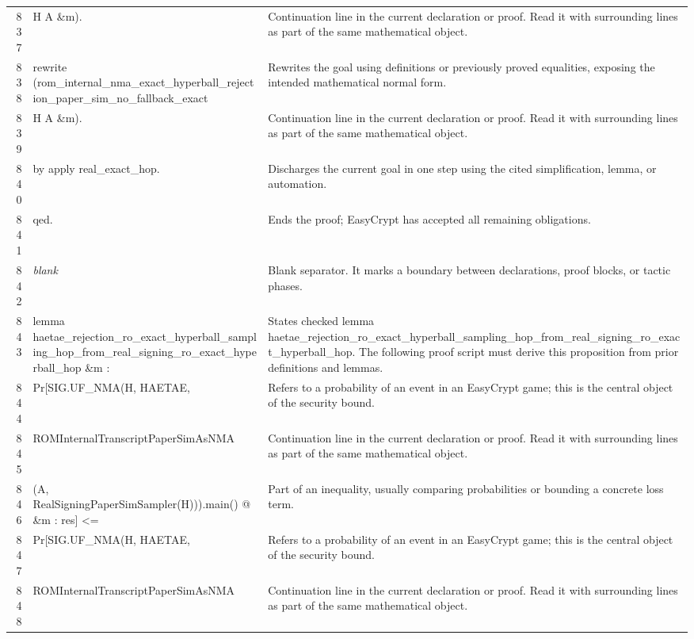 \documentclass[10pt]{article}
\begin{document}
\begin{longtable}{r L{0.53\textwidth} L{0.37\textwidth}}
837 & {\ttfamily\scriptsize             H A \&m).} & Continuation line in the current declaration or proof.  Read it with surrounding lines as part of the same mathematical object. \\
838 & {\ttfamily\scriptsize rewrite (rom\_internal\_nma\_exact\_hyperball\_rejection\_paper\_sim\_no\_fallback\_exact} & Rewrites the goal using definitions or previously proved equalities, exposing the intended mathematical normal form. \\
839 & {\ttfamily\scriptsize            H A \&m).} & Continuation line in the current declaration or proof.  Read it with surrounding lines as part of the same mathematical object. \\
840 & {\ttfamily\scriptsize by apply real\_exact\_hop.} & Discharges the current goal in one step using the cited simplification, lemma, or automation. \\
841 & {\ttfamily\scriptsize qed.} & Ends the proof; EasyCrypt has accepted all remaining obligations. \\
842 & {\ttfamily\scriptsize \emph{blank}} & Blank separator.  It marks a boundary between declarations, proof blocks, or tactic phases. \\
843 & {\ttfamily\scriptsize lemma haetae\_rejection\_ro\_exact\_hyperball\_sampling\_hop\_from\_real\_signing\_ro\_exact\_hyperball\_hop \&m :} & States checked lemma haetae\_rejection\_ro\_exact\_hyperball\_sampling\_hop\_from\_real\_signing\_ro\_exact\_hyperball\_hop.  The following proof script must derive this proposition from prior definitions and lemmas. \\
844 & {\ttfamily\scriptsize   Pr[SIG.UF\_NMA(H, HAETAE,} & Refers to a probability of an event in an EasyCrypt game; this is the central object of the security bound. \\
845 & {\ttfamily\scriptsize        ROMInternalTranscriptPaperSimAsNMA} & Continuation line in the current declaration or proof.  Read it with surrounding lines as part of the same mathematical object. \\
846 & {\ttfamily\scriptsize          (A, RealSigningPaperSimSampler(H))).main() @ \&m : res] <=} & Part of an inequality, usually comparing probabilities or bounding a concrete loss term. \\
847 & {\ttfamily\scriptsize   Pr[SIG.UF\_NMA(H, HAETAE,} & Refers to a probability of an event in an EasyCrypt game; this is the central object of the security bound. \\
848 & {\ttfamily\scriptsize        ROMInternalTranscriptPaperSimAsNMA} & Continuation line in the current declaration or proof.  Read it with surrounding lines as part of the same mathematical object. \\

\end{longtable}
\end{document}
